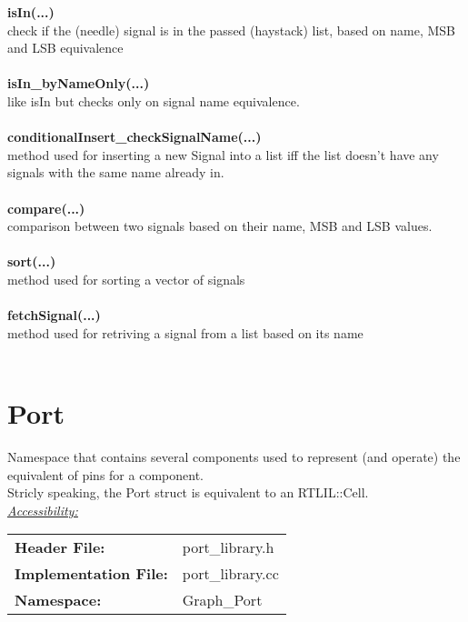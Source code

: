 \documentclass{article}
\newcommand{\sectionbreak}{\clearpage}
\begin{document}
\textbf{isIn(...)}\\
check if the (needle) signal is in the passed (haystack) list, based on name, MSB and LSB equivalence\\\\
\textbf{isIn\_byNameOnly(...)}\\
like isIn but checks only on signal name equivalence.\\\\
\textbf{conditionalInsert\_checkSignalName(...)}\\
method used for inserting a new Signal into a list iff  the list doesn't have any signals with the same name already in.\\\\
\textbf{compare(...)}\\
comparison between two signals based on their name, MSB and LSB values.\\\\
\textbf{sort(...)}\\
method used for sorting a vector of signals\\\\
\textbf{fetchSignal(...)}\\
method used for retriving a signal from a list based on its name\\\\

\sectionbreak{\clearpage}


\section{Port}

Namespace that contains several components used to represent (and operate) the equivalent of pins for a component.\\
Stricly speaking, the Port struct is equivalent to an RTLIL::Cell.\\

\underline{\textit{\underline{Accessibility: }}}\\

\begin{tabular}{ll}
	\textbf{Header File:} & port\_library.h\\
	\textbf{Implementation File:} & port\_library.cc\\
	\textbf{Namespace: } & Graph\_Port\\
\end{tabular}\\
\end{document}
